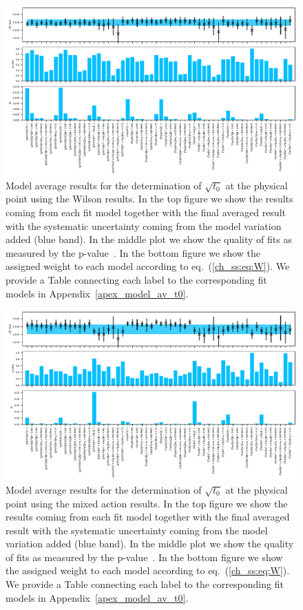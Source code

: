 \begin{figure}
    \centering
    \includegraphics[width=2.\textwidth, angle=90]{./cap5/figs/BMA_w.pdf}
    \caption{Model average results for the determination of $\sqrt{t_0}$ at the physical point using the Wilson results. In the top figure we show the results coming from each fit model together with the final averaged result with the systematic uncertainty coming from the model variation added (blue band). In the middle plot we show the quality of fits as measured by the p-value~\cite{chi_exp}. In the bottom figure we show the assigned weight to each model according to eq.~(\ref{ch_ss:eq:W}). We provide a Table connecting each label to the corresponding fit models in Appendix~\ref{apex_model_av_t0}.}
    \label{ch_ss:fig:BMA_w}
\end{figure}

\begin{figure}
    \centering
    \includegraphics[width=1.\textwidth]{./cap5/figs/BMA_tm.pdf}
    \caption{Model average results for the determination of $\sqrt{t_0}$ at the physical point using the mixed action results. In the top figure we show the results coming from each fit model together with the final averaged result with the systematic uncertainty coming from the model variation added (blue band). In the middle plot we show the quality of fits as measured by the p-value~\cite{chi_exp}. In the bottom figure we show the assigned weight to each model according to eq.~(\ref{ch_ss:eq:W}). We provide a Table connecting each label to the corresponding fit models in Appendix~\ref{apex_model_av_t0}.}
    \label{ch_ss:fig:BMA_tm}
\end{figure}

